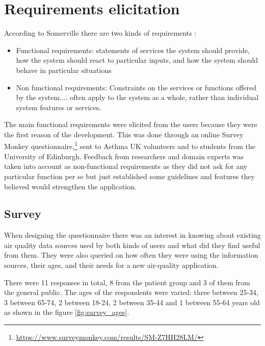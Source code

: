 \section{Requirements elicitation}
According to Somerville there are two kinds of requirements \cite{Sommerville2010}:
\begin{displayquote}
\begin{itemize}

\item Functional requirements: statements of services the system should provide, how the system should react to particular inputs, and how the system should behave in particular situations

\item Non functional requirements: Constraints on the services or functions offered by the system.... often apply to the system as a whole, rather than individual system features or services.


\end{itemize}
\end{displayquote}

The main functional requirements were elicited from the users because they were the first reason of the development. This was done through an online Survey Monkey questionnaire,\footnote{\url{https://www.surveymonkey.com/results/SM-Z7HH28LM/}} sent to Asthma UK volunteers and to students from the University of Edinburgh. Feedback from researchers and domain experts was taken into account as non-functional requirements as they did not ask for any particular function per se but just established some guidelines and features they believed would strengthen the application.

\subsection{Survey}

When designing the questionnaire there was an interest in knowing about existing air quality data sources used by both kinds of users and what did they find useful from them. They were also queried on how often they were using the information sources, their ages, and their needs for a new air-quality application.

There were 11 responses in total, 8 from the patient group and 3 of them from the general public. The ages of the respondents were varied: three between 25-34, 3 between 65-74, 2 between 18-24, 2 between 35-44 and 1 between 55-64 years old as shown in the figure \ref{fig:survey_ages}. 

